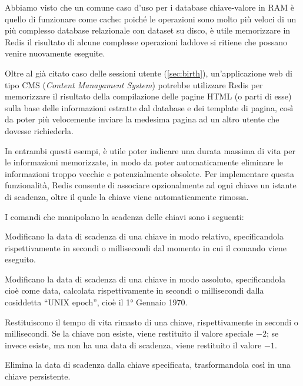 Abbiamo visto che un comune caso d'uso per i database chiave-valore in RAM è quello di funzionare
come cache: poiché le operazioni sono molto più veloci di un più complesso database relazionale con
dataset su disco, è utile memorizzare in Redis il risultato di alcune complesse operazioni laddove
si ritiene che possano venire nuovamente eseguite. 

Oltre al già citato caso delle sessioni utente (\autoref{sec:birth}), un'applicazione web di tipo CMS
(\emph{Content Managament System}) potrebbe utilizzare Redis per memorizzare il risultato della
compilazione delle pagine HTML (o parti di esse) sulla base delle informazioni estratte dal database
e dei template di pagina, così da poter più velocemente inviare la medesima pagina ad un altro
utente che dovesse richiederla.

In entrambi questi esempi, è utile poter indicare una durata massima di vita per le informazioni
memorizzate, in modo da poter automaticamente eliminare le informazioni troppo vecchie e
potenzialmente obsolete. Per implementare questa funzionalità, Redis consente di associare
opzionalmente ad ogni chiave un istante di scadenza, oltre il quale la chiave viene automaticamente
rimossa.

I comandi che manipolano la scadenza delle chiavi sono i seguenti:

\begin{description}[style=nextline,font={\bfseries\ttfamily}]
	\item[EXPIRE key sec / PEXPIRE key msec] Modificano la data di scadenza di una chiave in modo
		relativo, specificandola rispettivamente in secondi o millisecondi dal momento in cui il
		comando viene eseguito.
	\item[EXPIREAT key timestamp / PEXPIREAT key mstimestamp] Modificano la data di scadenza di una
		chiave in modo assoluto, specificandola cioè come data, calcolata rispettivamente in secondi
		o millisecondi dalla cosiddetta ``UNIX epoch'', cioè il 1° Gennaio 1970.
	\item[TTL key / PTTL key] Restituiscono il tempo di vita rimasto di una chiave, rispettivamente
		in secondi o millisecondi. Se la chiave non esiste, viene restituito il valore speciale $-2$;
		se invece esiste, ma non ha una data di scadenza, viene restituito il valore $-1$.
	\item[PERSIST key] Elimina la data di scadenza dalla chiave specificata, trasformandola così in
		una chiave persistente.
\end{description}

